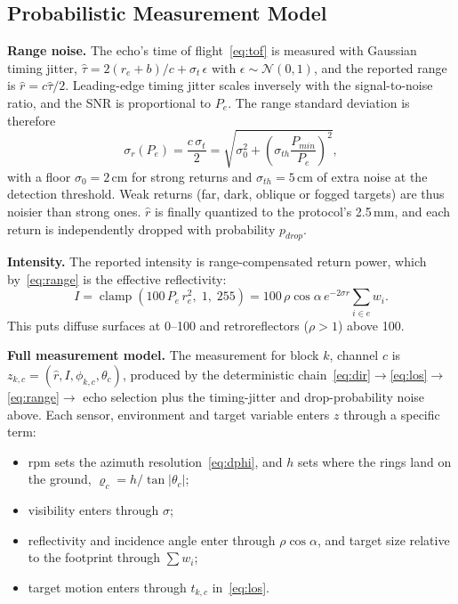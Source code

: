 \documentclass[11pt]{article}
\begin{document}
\subsection{Probabilistic Measurement Model}\label{sec:prob}
\textbf{Range noise.} The echo's time of flight~\eqref{eq:tof} is measured with Gaussian timing jitter, $\hat{\tau} = 2(r_e + b)/c + \sigma_t\,\epsilon$ with
$\epsilon \sim \mathcal{N}(0,1)$, and the reported range is $\hat{r} = c\hat{\tau}/2$. Leading-edge timing jitter scales inversely with the signal-to-noise ratio,
and the SNR is proportional to $P_e$. The range standard deviation is therefore
\begin{equation}\label{eq:sigma}
    \sigma_r(P_e) = \frac{c\,\sigma_t}{2} = \sqrt{\sigma_0^2 + \left(\sigma_{th}\frac{P_{min}}{P_e}\right)^2},
\end{equation}
with a floor $\sigma_0 = 2$\,cm for strong returns and $\sigma_{th} = 5$\,cm of extra noise at the detection threshold.
Weak returns (far, dark, oblique or fogged targets) are thus noisier than strong ones. $\hat{r}$ is finally quantized to the protocol's 2.5\,mm,
and each return is independently dropped with probability $p_{drop}$.

\textbf{Intensity.} The reported intensity is range-compensated return power, which by~\eqref{eq:range} is the effective reflectivity:
\begin{equation}
    I = \operatorname{clamp}\!\left(100\, P_e\, r_e^2,\; 1,\; 255\right) = 100\,\rho\cos\alpha\, e^{-2\sigma r}\textstyle\sum_{i\in e} w_i.
\end{equation}
This puts diffuse surfaces at 0--100 and retroreflectors ($\rho > 1$) above 100.

\textbf{Full measurement model.} The measurement for block $k$, channel $c$ is $z_{k,c} = (\hat{r}, I, \phi_{k,c}, \theta_c)$, produced by the
deterministic chain~\eqref{eq:dir}$\to$\eqref{eq:los}$\to$\eqref{eq:range}$\to$ echo selection plus the timing-jitter and drop-probability noise above.
Each sensor, environment and target variable enters $z$ through a specific term:
\begin{itemize}
    \item rpm sets the azimuth resolution~\eqref{eq:dphi}, and $h$ sets where the rings land on the ground, $\varrho_c = h/\tan|\theta_c|$;
    \item visibility enters through $\sigma$;
    \item reflectivity and incidence angle enter through $\rho\cos\alpha$, and target size relative to the footprint through $\sum w_i$;
    \item target motion enters through $t_{k,c}$ in~\eqref{eq:los}.
\end{itemize}
\end{document}
